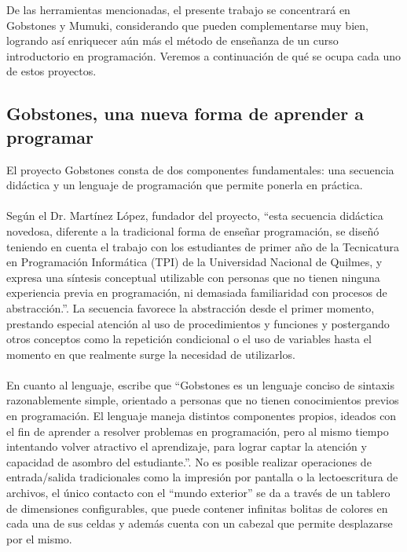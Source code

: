 De las herramientas mencionadas, el presente trabajo se concentrará en Gobstones y Mumuki, considerando que pueden complementarse muy bien, logrando así enriquecer aún más el método de enseñanza de un curso introductorio en programación. Veremos a continuación de qué se ocupa cada uno de estos proyectos.

\subsection{Gobstones, una nueva forma de aprender a programar}
El proyecto Gobstones consta de dos componentes fundamentales: una secuencia didáctica y un lenguaje de programación que permite ponerla en práctica.
\\\\
Según el Dr. Martínez López, fundador del proyecto, ``esta secuencia didáctica novedosa, diferente a la tradicional forma de enseñar programación, se diseñó teniendo en cuenta el trabajo con los estudiantes de primer año de la Tecnicatura en Programación Informática (TPI) de la Universidad Nacional de Quilmes, y expresa una síntesis conceptual utilizable con personas que no tienen ninguna experiencia previa en programación, ni demasiada familiaridad con procesos de abstracción.''\cite[Prefacio]{LibroGobstones}. La secuencia favorece la abstracción desde el primer momento, prestando especial atención al uso de procedimientos y funciones y postergando otros conceptos como la repetición condicional o el uso de variables hasta el momento en que realmente surge la necesidad de utilizarlos.
\\\\
En cuanto al lenguaje, escribe que ``Gobstones es un lenguaje conciso de sintaxis razonablemente simple, orientado a personas que no tienen conocimientos previos en programación. El lenguaje maneja distintos componentes propios, ideados con el fin de aprender a resolver problemas en programación, pero al mismo tiempo intentando volver atractivo el aprendizaje, para lograr captar la atención y capacidad de asombro del estudiante.''\cite[Capítulo~2]{LibroGobstones}. No es posible realizar operaciones de entrada/salida tradicionales como la impresión por pantalla o la lectoescritura de archivos, el único contacto con el ``mundo exterior'' se da a través de un tablero de dimensiones configurables, que puede contener infinitas bolitas de colores en cada una de sus celdas y además cuenta con un cabezal que permite desplazarse por el mismo.
\\\\

